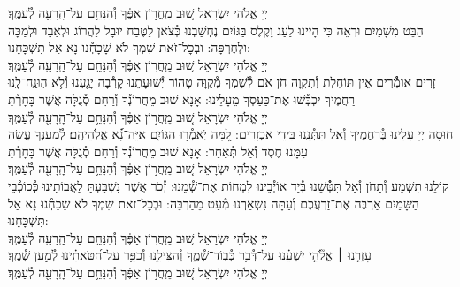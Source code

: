 \documentclass[twoside, openany, parskip=half, 11pt]{book}
\begin{document}
\nefilasapayim \label{nefilas_apayim}

\begin{sometimes}

\setlength{\LTpost}{0pt}

יְיָ אֱלֹהֵי יִשְׂרָאֵל  שׁ֚וּב מֵֽחֲר֣וֹן אַפֶּ֔ךָ וְ֯הִנָּחֵ֥ם עַל־הָֽרָעָ֖ה לְ֯עַמֶּֽךָ׃\\
הַבֵּט מִשָׁמַיִם וּרְאֵה כִּי הָיִינוּ לַעַג וָקֶלֶס בַּגּוֹיִם נֶחְשַׁבְנוּ כְּ֯צֹאן לַטֶּבַח יוּבָל לַהֲרוֹג וּלְאַבֵּד וּלְמַכָּה וּלְחֶרְפָּה: וּבְכׇל־זֹאת שִׁמְךָ לֹא שָׁכָחְ֯נוּ נָא אַל תִּשְׁכָּחֵנוּ:\\
יְיָ אֱלֹהֵי יִשְׂרָאֵל שׁ֚וּב מֵֽחֲר֣וֹן אַפֶּ֔ךָ וְ֯הִנָּחֵ֥ם עַל־הָֽרָעָ֖ה לְ֯עַמֶּֽךָ׃\\
זָרִים אוֹמְ֯֯רִים אֵין תּוֹחֶלֶת וְ֯תִקְוָה חֹן אֹם לְ֯שִׁמְךָ מְ֯קַוָּה טָהוֹר יְ֯שׁוּעָתֵנוּ קָרְ֯בָה יָגַ֖עְנוּ וְ֯לֹ֥א הֽוּנַֽח־לָֽנוּ רַחֲמֶיךָ יִכְבְּ֯שׁוּ אֶת־כַּעַסְךָ מֵעָלֵינוּ: אָנָא שׁוּב מֵחֲרוֹנְ֯ךָ וְ֯רַחֵם סְ֯גֻלָּה אֲשֶׁר בָּחָרְ֯תָּ\\
יְיָ אֱלֹהֵי יִשְׂרָאֵל שׁ֚וּב מֵֽחֲר֣וֹן אַפֶּ֔ךָ וְ֯הִנָּחֵ֥ם עַל־הָֽרָעָ֖ה לְ֯עַמֶּֽךָ׃\\
חוּסָה יְיָ עָלֵינוּ בְּ֯רַחֲמֶיךָ וְ֯אַל תִּתְּ֯נֵֽנוּ בִּידֵי אַכְזָרִים:
לׇׇ֭מָּה יֹֽאמְ֯ר֣וּ הַגּוֹיִ֑ם אַיֵּה־נָ֝֗א אֱלֹֽהֵיהֶֽם׃
לְ֯מַעַנְךָ עֲשֵׂה עִמָּנוּ חֶסֶד וְ֯אַל תְּ֯אַחַר:
אָנָא שׁוּב מֵחֲרוֹנְ֯ךָ וְ֯רַחֵם סְ֯גֻלָּה אֲשֶׁר בָּחָרְ֯תָּ\\
יְיָ אֱלֹהֵי יִשְׂרָאֵל שׁ֚וּב מֵֽחֲר֣וֹן אַפֶּ֔ךָ וְ֯הִנָּחֵ֥ם עַל־הָֽרָעָ֖ה לְ֯עַמֶּֽךָ׃\\
קוֹלֵנוּ תִשְׁמַע וְ֯תָחֹן וְ֯אַל תִּטְּ֯֯שֵׁנוּ בְּ֯יַד אוֹיְ֯בֵינוּ לִמְחוֹת אֶת־שְׁ֯מֵנוּ:
זְ֯כֹר אֲשֶׁר נִשְׁבַּעְתָּ לַאֲבוֹתֵינוּ כְּ֯כוֹכְ֯בֵי הַשָּׁמַיִם אַרְבֶּה אֶת־זַרְעֲכֶם וְ֯עַתָּה נִשְׁאַרְנוּ מְ֯עַט מֵהַרְבֵּה:
וּבְכׇל־זֹאת שִׁמְךָ לֹא שָׁכָחְ֯נוּ נָא אַל תִּשְׁכָּחֵנוּ:\\
יְיָ אֱלֹהֵי יִשְׂרָאֵל שׁ֚וּב מֵֽחֲר֣וֹן אַפֶּ֔ךָ וְ֯הִנָּחֵ֥ם עַל־הָֽרָעָ֖ה לְ֯עַמֶּֽךָ׃\\
עׇזְרֵ֤נוּ ׀ אֱלֹ֘הֵ֤י יִשְׁעֵ֗נוּ עַֽל־דְּ֯בַ֥ר כְּ֯בֽוֹד־שְׁ֯מֶ֑ךָ וְ֯הַצִּילֵ֥נוּ וְ֯כַפֵּ֥ר עַל־חַ֝טֹּאתֵ֗ינוּ לְ֯מַ֣עַן שְׁ֯מֶֽךָ׃\\
יְיָ אֱלֹהֵי יִשְׂרָאֵל שׁ֚וּב מֵֽחֲר֣וֹן אַפֶּ֔ךָ וְ֯הִנָּחֵ֥ם עַל־הָֽרָעָ֖ה לְ֯עַמֶּֽךָ׃\\


\end{sometimes}
\end{document}
